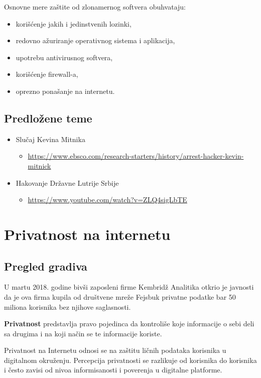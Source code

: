 \documentclass[a4paper, 12pt]{article}
\begin{document}
Osnovne mere zaštite od zlonamernog softvera obuhvataju:
\begin{itemize}
    \item korišćenje jakih i jedinstvenih lozinki,
    \item redovno ažuriranje operativnog sistema i aplikacija,
    \item upotrebu antivirusnog softvera,
    \item korišćenje firewall-a,
    \item oprezno ponašanje na internetu.
\end{itemize}

\subsection{Predložene teme}

\begin{itemize}
    \item Slučaj Kevina Mitnika
    \begin{itemize}
        \item \url{https://www.ebsco.com/research-starters/history/arrest-hacker-kevin-mitnick}
    \end{itemize}
    \item Hakovanje Državne Lutrije Srbije
    \begin{itemize}
        \item \url{https://www.youtube.com/watch?v=ZLQ4sigLbTE}
    \end{itemize}
    
\end{itemize}


\section{Privatnost na internetu}
\subsection{Pregled gradiva}

U martu 2018. godine bivši zaposleni firme Kembridž Analitika otkrio je javnosti da je ova firma kupila od društvene mreže Fejsbuk privatne podatke bar 50 miliona korisnika bez njihove saglasnosti. 

\textbf{Privatnost} predstavlja pravo pojedinca da kontroliše koje informacije o sebi
deli sa drugima i na koji način se te informacije koriste.

Privatnost na Internetu odnosi se na zaštitu ličnih podataka korisnika u digitalnom
okruženju. Percepcija privatnosti se razlikuje od korisnika do korisnika i
često zavisi od nivoa informisanosti i poverenja u digitalne platforme.
\end{document}
